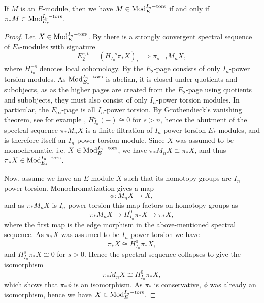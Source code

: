 \begin{lemma}
    \label{ch1:lm:monochromatic-iff-torsion-modules}
    If $M$ is an $E$-module, then we have $M\in \mathrm{Mod}_{E}^{I_n-\mathrm{tors}}$ if and only if $\pi_* M\in \mathrm{Mod}_{E_*}^{I_n-\mathrm{tors}}$. 
\end{lemma}
\begin{proof}
    Let $X\in \mathrm{Mod}_{E}^{I_n-\mathrm{tors}}$. By \cite[3.19]{barthel-heard-valenzuela_2018} there is a strongly convergent spectral sequence of $E_*$-modules with signature 
    \[E_2^{s,t} = (H_{I_n}^{-s}\pi_* X)_t \implies \pi_{s+t}M_n X,\]
    where $H_{I_n}^{-s}$ denotes local cohomology. By \cite[2.1.3(ii)]{brodmann-sharp_1998} the $E_2$-page consists of only $I_n$-power torsion modules. As $\mathrm{Mod}_{E_*}^{I_n-\mathrm{tors}}$ is abelian, it is closed under quotients and subobjects, as as the higher pages are created from the $E_2$-page using quotients and subobjects, they must also consist of only $I_n$-power torsion modules. In particular, the $E_\infty$-page is all $I_n$-power torsion. By Grothendieck's vanishing theorem, see for example \cite[6.1.2]{brodmann-sharp_1998}, $H_{I_n}^s(-)\cong 0$ for $s>n$, hence the abutment of the spectral sequence $\pi_* M_n X$ is a finite filtration of $I_n$-power torsion $E_*$-modules, and is therefore itself an $I_n$-power torsion module. Since $X$ was assumed to be monochromatic, i.e. $X\in \mathrm{Mod}_{E}^{I_n-\mathrm{tors}}$, we have $\pi_* M_n X\cong \pi_* X$, and thus $\pi_* X\in \mathrm{Mod}_{E_*}^{I_n-\mathrm{tors}}$. 

    Now, assume we have an $E$-module $X$ such that its homotopy groups are $I_n$-power torsion. Monochromatization gives a map 
    \[\phi\colon M_n X\longrightarrow X,\] 
    and as $\pi_*M_nX$ is $I_n$-power torsion this map factors on homotopy groups as 
    \[\pi_* M_n X\longrightarrow H^0_{I_n}\pi_* X\longrightarrow \pi_* X,\]
    where the first map is the edge morphism in the above-mentioned spectral sequence. As $\pi_* X$ was assumed to be $I_n$-power torsion we have 
    \[\pi_*X\cong H^0_{I_n}\pi_* X,\] 
    and $H^s_{I_n}\pi_* X \cong 0$ for $s>0$. Hence the spectral sequence collapses to give the isomorphism 
    \[\pi_* M_n X\cong H^0_{I_n}\pi_* X,\] 
    which shows that $\pi_* \phi$ is an isomorphism. As $\pi_*$ is conservative, $\phi$ was already an isomorphism, hence we have $X\in \mathrm{Mod}_{E}^{I_n-\mathrm{tors}}$. 
\end{proof}

